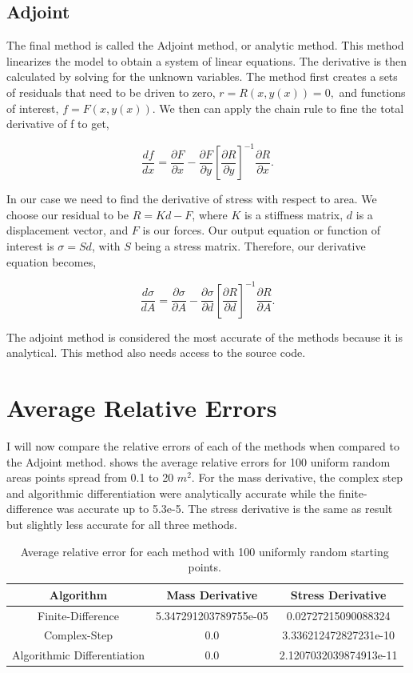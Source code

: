\documentclass{article}
\begin{document}
\subsection*{Adjoint}

The final method is called the Adjoint method, or analytic method. This method linearizes the model to obtain a system of linear equations. The derivative is then calculated by solving for the unknown variables. The method first creates a sets of residuals that need to be driven to zero, $ r = R(x,y(x)) = 0,$ and functions of interest, $ f=F(x,y(x)). $ We then can apply the chain rule to fine the total derivative of f to get,

$$ \frac{df}{dx}=\frac{\partial F}{\partial x}-\frac{\partial F}{\partial y}\left[\frac{\partial R}{\partial y}\right]^{-1} \frac{\partial R}{\partial x}.$$

In our case we need to find the derivative of stress with respect to area. We choose our residual to be $R=Kd-F$, where $K$ is a stiffness matrix, $d$ is a displacement vector, and $F$ is our forces. Our output equation or function of interest is $\sigma=Sd$, with $S$ being a stress matrix. Therefore, our derivative equation becomes,

$$ \frac{d\sigma}{dA}=\frac{\partial \sigma}{\partial A}-\frac{\partial \sigma}{\partial d}\left[\frac{\partial R}{\partial d}\right]^{-1} \frac{\partial R}{\partial A}.$$

The adjoint method is considered the most accurate of the methods because it is analytical. This method also needs access to the source code.

\section*{Average Relative Errors}

I will now compare the relative errors of each of the methods when compared to the Adjoint method.  shows the average relative errors for 100 uniform random areas points spread from 0.1 to 20 $m^2$. For the mass derivative, the complex step and algorithmic differentiation were analytically accurate while the finite-difference was accurate up to 5.3e-5. The stress derivative is the same as result but slightly less accurate for all three methods. 

\begin{table}[htb]
	\centering
	\caption{Average relative error for each method with 100 uniformly random starting points.}
	\label{tab:comp_der}
	\begin{tabular}{c|c|c}
		\toprule
		Algorithm & Mass Derivative & Stress Derivative \\
		\midrule
		Finite-Difference & 5.347291203789755e-05 & 0.02727215090088324 \\
		Complex-Step  & 0.0 & 3.336212472827231e-10 \\
		Algorithmic Differentiation & 0.0 & 2.1207032039874913e-11 \\
		\bottomrule
	\end{tabular}
\end{table}
\end{document}
